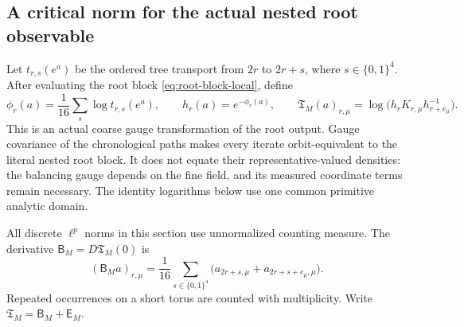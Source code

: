 \documentclass[11pt,oneside,openany]{book}
\theoremstyle{definition}
\theoremstyle{remark}
\begin{document}
\subsection{A critical norm for the actual nested root observable}
Let $t_{r,s}(e^a)$ be the ordered tree transport from $2r$ to $2r+s$,
where $s\in\{0,1\}^4$. After evaluating the root block
\cref{eq:root-block-local}, define
\[
 \phi_r(a)=\frac1{16}\sum_s\log t_{r,s}(e^a),\qquad
 h_r(a)=e^{-\phi_r(a)},\qquad
 \mathfrak T_M(a)_{r,\mu}=\log\bigl(h_rK_{r,\mu}h_{r+e_\mu}^{-1}\bigr).
\]
This is an actual coarse gauge transformation of the root output.
Gauge covariance of the chronological paths makes every iterate
orbit-equivalent to the literal nested root block. It does not equate
their representative-valued densities: the balancing gauge depends on
the fine field, and its measured coordinate terms remain necessary.
The identity logarithms below use one common primitive analytic domain.

All discrete $\ell^p$ norms in this section use unnormalized counting
measure. The derivative $\mathsf B_M=D\mathfrak T_M(0)$ is
\begin{equation}
 (\mathsf B_Ma)_{r,\mu}=\frac1{16}\sum_{s\in\{0,1\}^4}
       \bigl(a_{2r+s,\mu}+a_{2r+s+e_\mu,\mu}\bigr).
 \label{eq:classical-linear-root}
\end{equation}
Repeated occurrences on a short torus are counted with multiplicity.
Write $\mathfrak T_M=\mathsf B_M+\mathsf E_M$.
\end{document}
